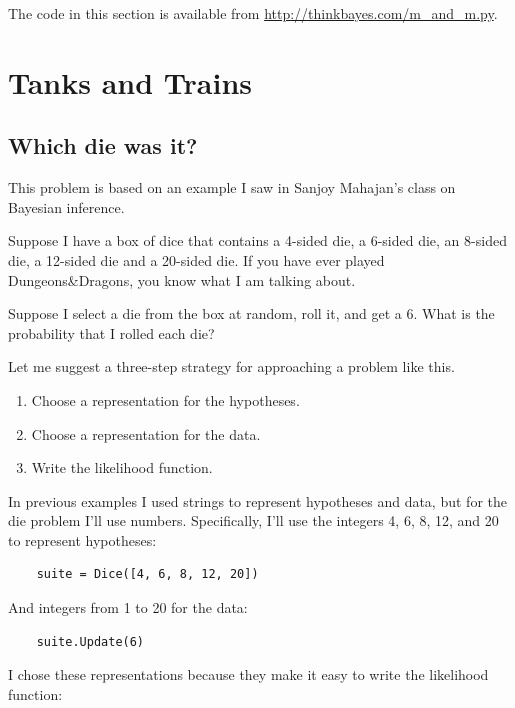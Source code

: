 \documentclass[12pt]{book}
\begin{document}
The code in this section is available from
\url{http://thinkbayes.com/m_and_m.py}.


\chapter{Tanks and Trains}

\section{Which die was it?}

This problem is based on an example I saw in Sanjoy Mahajan's class
on Bayesian inference.

Suppose I have a box of dice that contains a 4-sided die, a 6-sided
die, an 8-sided die, a 12-sided die and a 20-sided die.  If you
have ever played Dungeons\&Dragons, you know what I am talking about.

Suppose I select a die from the box at random, roll it, and get a 6.
What is the probability that I rolled each die?

Let me suggest a three-step strategy for approaching a problem like this.

\begin{enumerate}

\item Choose a representation for the hypotheses.

\item Choose a representation for the data.

\item Write the likelihood function.

\end{enumerate}

In previous examples I used strings to represent hypotheses and
data, but for the die problem I'll use numbers.  Specifically,
I'll use the integers 4, 6, 8, 12, and 20 to represent hypotheses:

\begin{verbatim}
    suite = Dice([4, 6, 8, 12, 20])
\end{verbatim}

And integers from 1 to 20 for the data:

\begin{verbatim}
    suite.Update(6)
\end{verbatim}

I chose these representations because they make it easy to
write the likelihood function:
\end{document}
